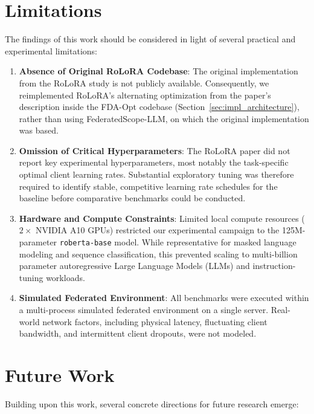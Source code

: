 \section{Limitations}
\label{sec:limitations}

The findings of this work should be considered in light of several practical and experimental limitations:

\begin{enumerate}
    \item \textbf{Absence of Original RoLoRA Codebase}: The original implementation from the RoLoRA study \cite{chen2025robust} is not publicly available. Consequently, we reimplemented RoLoRA's alternating optimization from the paper's description inside the FDA-Opt codebase \cite{theologitis2025fda} (Section~\ref{sec:impl_architecture}), rather than using FederatedScope-LLM, on which the original implementation was based.
    
    \item \textbf{Omission of Critical Hyperparameters}: The RoLoRA paper did not report key experimental hyperparameters, most notably the task-specific optimal client learning rates. Substantial exploratory tuning was therefore required to identify stable, competitive learning rate schedules for the baseline before comparative benchmarks could be conducted.
    
    \item \textbf{Hardware and Compute Constraints}: Limited local compute resources ($2\times$ NVIDIA A10 GPUs) restricted our experimental campaign to the 125M-parameter \texttt{roberta-base} model. While representative for masked language modeling and sequence classification, this prevented scaling to multi-billion parameter autoregressive Large Language Models (LLMs) and instruction-tuning workloads.
    
    \item \textbf{Simulated Federated Environment}: All benchmarks were executed within a multi-process simulated federated environment on a single server. Real-world network factors, including physical latency, fluctuating client bandwidth, and intermittent client dropouts, were not modeled.
\end{enumerate}

\section{Future Work}
\label{sec:future_work}

Building upon this work, several concrete directions for future research emerge:

